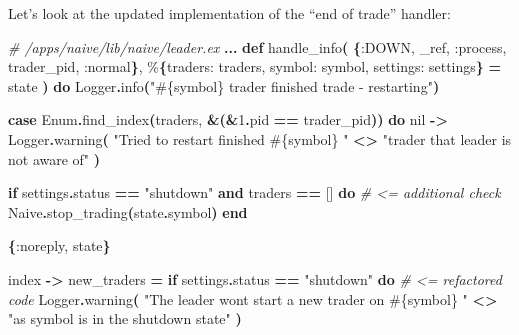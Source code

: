 \documentclass[
  oneside]{book}
\newenvironment{Shaded}{\begin{snugshade}}{\end{snugshade}}
\newcommand{\CommentTok}[1]{\textcolor[rgb]{0.56,0.35,0.01}{\textit{#1}}}
\newcommand{\ConstantTok}[1]{\textcolor[rgb]{0.56,0.35,0.01}{#1}}
\newcommand{\ControlFlowTok}[1]{\textcolor[rgb]{0.13,0.29,0.53}{\textbf{#1}}}
\newcommand{\DecValTok}[1]{\textcolor[rgb]{0.00,0.00,0.81}{#1}}
\newcommand{\FunctionTok}[1]{\textcolor[rgb]{0.13,0.29,0.53}{\textbf{#1}}}
\newcommand{\KeywordTok}[1]{\textcolor[rgb]{0.13,0.29,0.53}{\textbf{#1}}}
\newcommand{\NormalTok}[1]{#1}
\newcommand{\OperatorTok}[1]{\textcolor[rgb]{0.81,0.36,0.00}{\textbf{#1}}}
\newcommand{\OtherTok}[1]{\textcolor[rgb]{0.56,0.35,0.01}{#1}}
\newcommand{\StringTok}[1]{\textcolor[rgb]{0.31,0.60,0.02}{#1}}
\newcommand{\VariableTok}[1]{\textcolor[rgb]{0.00,0.00,0.00}{#1}}
\begin{document}
Let's look at the updated implementation of the ``end of trade'' handler:

\begin{Shaded}
\begin{Highlighting}[]
\CommentTok{\# /apps/naive/lib/naive/leader.ex}
  \OperatorTok{...}
  \KeywordTok{def}\NormalTok{ handle\_info}\FunctionTok{(}
        \FunctionTok{\{}\VariableTok{:DOWN}\NormalTok{, \_ref, }\VariableTok{:process}\NormalTok{, trader\_pid, }\VariableTok{:normal}\FunctionTok{\}}\NormalTok{,}
\NormalTok{        \%}\FunctionTok{\{}\VariableTok{traders:}\NormalTok{ traders, }\VariableTok{symbol:}\NormalTok{ symbol, }\VariableTok{settings:}\NormalTok{ settings}\FunctionTok{\}} \OperatorTok{=}\NormalTok{ state}
      \FunctionTok{)} \KeywordTok{do}
    \ConstantTok{Logger}\OperatorTok{.}\NormalTok{info}\FunctionTok{(}\StringTok{"}\OtherTok{\#\{}\NormalTok{symbol}\OtherTok{\}}\StringTok{ trader finished trade {-} restarting"}\FunctionTok{)}

    \KeywordTok{case} \ConstantTok{Enum}\OperatorTok{.}\NormalTok{find\_index}\FunctionTok{(}\NormalTok{traders, }\OperatorTok{\&}\FunctionTok{(}\OperatorTok{\&}\DecValTok{1}\OperatorTok{.}\NormalTok{pid }\OperatorTok{==}\NormalTok{ trader\_pid}\FunctionTok{))} \KeywordTok{do}
      \ConstantTok{nil} \OperatorTok{{-}\textgreater{}}
        \ConstantTok{Logger}\OperatorTok{.}\NormalTok{warning}\FunctionTok{(}
          \StringTok{"Tried to restart finished }\OtherTok{\#\{}\NormalTok{symbol}\OtherTok{\}}\StringTok{ "} \OperatorTok{\textless{}\textgreater{}}
            \StringTok{"trader that leader is not aware of"}
        \FunctionTok{)}

        \ControlFlowTok{if}\NormalTok{ settings}\OperatorTok{.}\NormalTok{status }\OperatorTok{==} \StringTok{"shutdown"} \KeywordTok{and}\NormalTok{ traders }\OperatorTok{==} \OtherTok{[]} \KeywordTok{do} \CommentTok{\# \textless{}= additional check}
          \ConstantTok{Naive}\OperatorTok{.}\NormalTok{stop\_trading}\FunctionTok{(}\NormalTok{state}\OperatorTok{.}\NormalTok{symbol}\FunctionTok{)}
        \KeywordTok{end}

        \FunctionTok{\{}\VariableTok{:noreply}\NormalTok{, state}\FunctionTok{\}}

\NormalTok{      index }\OperatorTok{{-}\textgreater{}}
\NormalTok{        new\_traders }\OperatorTok{=}
          \ControlFlowTok{if}\NormalTok{ settings}\OperatorTok{.}\NormalTok{status }\OperatorTok{==} \StringTok{"shutdown"} \KeywordTok{do} \CommentTok{\# \textless{}= refactored code}
            \ConstantTok{Logger}\OperatorTok{.}\NormalTok{warning}\FunctionTok{(}
              \StringTok{"The leader won\textquotesingle{}t start a new trader on }\OtherTok{\#\{}\NormalTok{symbol}\OtherTok{\}}\StringTok{ "} \OperatorTok{\textless{}\textgreater{}}
                \StringTok{"as symbol is in the \textquotesingle{}shutdown\textquotesingle{} state"}
            \FunctionTok{)}
            

\end{Highlighting}
\end{Shaded}
\end{document}
